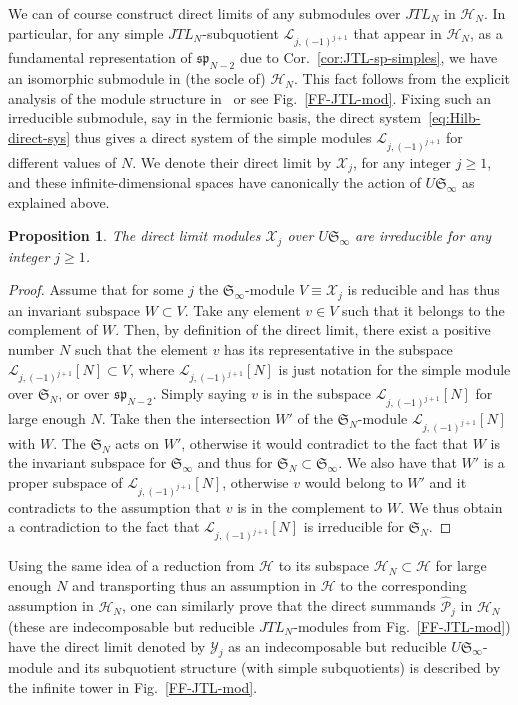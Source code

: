 \documentclass[11pt]{article}
\newcommand{\JTL}[1]{JTL_{#1}}
\newcommand{\Hilb}{\mathcal{H}}
\newcommand{\interLie}{\mathfrak{S}}
\newcommand{\interfin}[1]{\interLie_{#1}}
\newcommand{\interinfin}{\interLie_{\infty}}
\newcommand{\interM}[1]{\mathscr{X}_{#1}}
\newcommand{\interP}[1]{\mathscr{Y}_{#1}}
\newcommand{\ssp}{\mathfrak{sp}}
\newcommand{\AIrrTL}[2]{\mathscr{L}_{#1,#2}}
\newcommand{\APrTL}[1]{\widehat{\mathscr{P}}_{#1}}
\newtheorem{Prop}[subsection]{Proposition}
\theoremstyle{definition}
\begin{document}
We can of course construct direct limits of any submodules over $\JTL{N}$ in $\Hilb_{N}$.
In particular, for any simple $\JTL{N}$-subquotient $\AIrrTL{j}{(-1)^{j+1}}$ that appear in $\Hilb_N$, as a fundamental representation of $\ssp_{N-2}$ due to Cor.~\ref{cor:JTL-sp-simples}, we have an isomorphic submodule in (the socle of) $\Hilb_N$. This fact follows from the explicit analysis of the module structure in~\cite{GRS2} or see Fig.~\ref{FF-JTL-mod}. Fixing such an irreducible submodule, say in the fermionic basis, the  direct system~\eqref{eq:Hilb-direct-sys}
thus gives a direct system of the simple modules $\AIrrTL{j}{(-1)^{j+1}}$ for different values of $N$. We denote their direct limit by
$\interM{j}$, for any integer $j\geq 1$, and these infinite-dimensional spaces have canonically the action of $U \interinfin$ as explained above.

\begin{Prop}\label{prop:lim-simples}
The direct limit modules $\interM{j}$ over $U \interinfin$ are irreducible for any integer $j\geq 1$.
\end{Prop}
\begin{proof}
Assume that for some $j$ the $\interinfin$-module $V\equiv\interM{j}$ is reducible and has thus an invariant subspace $W\subset V$. Take any element $v\in V$ such that it belongs to the complement of $W$. Then, by definition of the direct limit, there exist a positive number $N$ such that the element $v$ has its representative in the subspace $\AIrrTL{j}{(-1)^{j+1}}[N]\subset V$, where $\AIrrTL{j}{(-1)^{j+1}}[N]$ is just notation for the simple module over $\interfin{N}$, or over $\ssp_{N-2}$. Simply saying $v$ is in the subspace $\AIrrTL{j}{(-1)^{j+1}}[N]$ for large enough $N$. Take then the intersection $W'$ of the $\interfin{N}$-module $\AIrrTL{j}{(-1)^{j+1}}[N]$ with $W$. The $\interfin{N}$ acts on $W'$, otherwise it would contradict to the fact that $W$ is the invariant subspace for $\interinfin$ and thus for $\interfin{N}\subset\interinfin$. We also have that $W'$ is a proper subspace of $\AIrrTL{j}{(-1)^{j+1}}[N]$, otherwise $v$ would belong to $W'$ and it contradicts to the assumption that $v$ is in the complement to $W$. We thus obtain a contradiction to the fact that $\AIrrTL{j}{(-1)^{j+1}}[N]$ is irreducible for $\interfin{N}$.
\end{proof}

Using the same idea of a reduction from $\Hilb$ to its subspace $\Hilb_N\subset\Hilb$ for large enough $N$ and transporting thus an assumption in $\Hilb$ to the corresponding assumption in $\Hilb_N$, one can similarly prove that the direct summands $\APrTL{j}$ in $\Hilb_N$ (these are indecomposable but reducible $\JTL{N}$-modules from Fig.~\ref{FF-JTL-mod}) have the direct limit denoted by $\interP{j}$ as an indecomposable but reducible $U\interinfin$-module and its subquotient structure (with simple subquotients) is described by the infinite tower in Fig.~\ref{FF-JTL-mod}.
\end{document}
